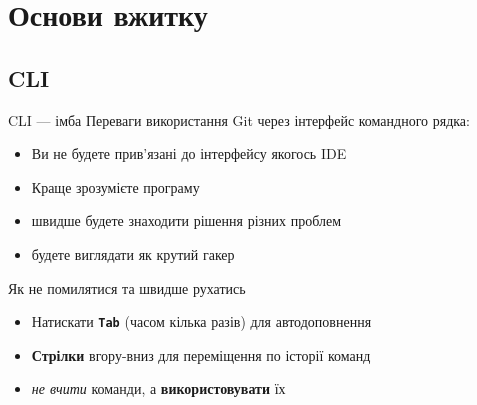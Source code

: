 \documentclass[
  ignorenonframetext,
  aspectratio=169,
]{beamer}
\providecommand{\tightlist}{%
  \setlength{\itemsep}{0pt}\setlength{\parskip}{0pt}}
\begin{document}
\hypertarget{ux43eux441ux43dux43eux432ux438-ux432ux436ux438ux442ux43aux443}{%
\section{Основи
вжитку}\label{ux43eux441ux43dux43eux432ux438-ux432ux436ux438ux442ux43aux443}}

\hypertarget{cli}{%
\subsection{CLI}\label{cli}}

\begin{frame}[fragile]{CLI --- імба}
\protect\hypertarget{cli-ux456ux43cux431ux430}{}
Переваги використання Git через інтерфейс командного рядка:

\pause

\begin{itemize}
\tightlist
\item
  Ви не будете прив'язані до інтерфейсу якогось IDE \pause
\item
  Краще зрозумієте програму \pause
\item
  швидше будете знаходити рішення різних проблем \pause
\item
  будете виглядати як крутий гакер \pause
\end{itemize}

\begin{block}{Як не помилятися та швидше рухатись}
\protect\hypertarget{ux44fux43a-ux43dux435-ux43fux43eux43cux438ux43bux44fux442ux438ux441ux44f-ux442ux430-ux448ux432ux438ux434ux448ux435-ux440ux443ux445ux430ux442ux438ux441ux44c}{}
\pause

\begin{itemize}
\tightlist
\item
  Натискати \textbf{\texttt{Tab}} (часом кілька разів) для
  автодоповнення \pause
\item
  \textbf{Стрілки} вгору-вниз для переміщення по історії команд \pause
\item
  \emph{не вчити} команди, а \textbf{використовувати} їх
\end{itemize}
\end{block}
\end{frame}
\end{document}
